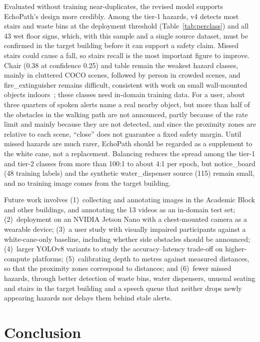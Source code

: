 \documentclass[3p,times,procedia]{elsarticle}
\DeclareRobustCommand{\rev}[1]{{\hlattr=1 #1}}
\DeclareRobustCommand{\rev}[1]{\hl{#1}}
\DeclareRobustCommand{\rev}[1]{#1}
\begin{document}
Evaluated without training near-duplicates, the revised model supports
EchoPath's design more credibly. Among the tier-1 hazards, v4 detects most
stairs and waste bins at the deployment threshold (Table~\ref{tab:perclass})
and all 43 wet floor signs, which, with this sample and a single source
dataset, must be confirmed in the target building before it can support a
safety claim. Missed stairs could cause a fall, so stairs recall is the most
important figure to improve. Chair (0.38 at confidence 0.25) and table remain
the weakest hazard classes, mainly in cluttered COCO scenes, followed by
person in crowded scenes, and fire\_extinguisher remains difficult,
consistent with work on small wall-mounted objects
indoors~\cite{farzaneh2022}; these classes need in-domain training data.
For a user, about three quarters of spoken alerts name a real nearby object,
but \rev{more than half of the obstacles in the walking path are not announced},
partly because of the rate limit and mainly because they are not detected,
and \rev{since the proximity zones are relative to each scene, ``close'' does not
guarantee a fixed safety margin}. Until missed hazards are much rarer,
EchoPath should be regarded as a supplement to the white cane, not a
replacement. \rev{Balancing reduces the spread among the tier-1 and tier-2
classes from more than 100:1 to about 4:1 per epoch}, but
notice\_board (48 training labels) and the synthetic water\_dispenser source
(115) remain small, and no training image comes from the target building.

Future work involves (1)~collecting and annotating images in the
Academic Block and other buildings, and annotating the 13 videos as an
in-domain test set; (2)~deployment on an NVIDIA Jetson Nano with a
chest-mounted camera as a wearable device; (3)~a user study with visually
impaired participants against a white-cane-only baseline, \rev{including
whether side obstacles should be announced}; (4)~larger YOLOv8 variants to
study the accuracy--latency trade-off on higher-compute platforms;
\rev{(5)~calibrating depth to metres against measured distances}, so that the
proximity zones correspond to distances; and (6)~fewer missed hazards,
through better detection of waste bins, water dispensers, unusual seating
and stairs in the target building and \rev{a speech queue that neither drops
newly appearing hazards nor delays them behind stale alerts}.

\section{Conclusion}
\label{sec:conclusion}
\end{document}
